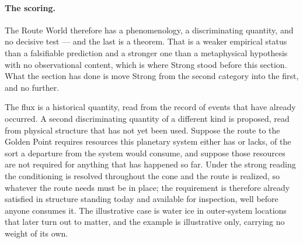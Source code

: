 \paragraph{The scoring.} The Route World therefore has a phenomenology, a
discriminating quantity, and no decisive test --- and the last is a
theorem. That is a weaker empirical status than a falsifiable prediction
and a stronger one than a metaphysical hypothesis with no observational
content, which is where Strong stood before this section. What the
section has done is move Strong from the second category into the first,
and no further.

\begin{remark}
\label{rw:rem:preposition}
The flux is a historical quantity, read from the record of events
that have already occurred. A second
discriminating quantity of a different kind is proposed, read from physical
structure that has not yet been used. Suppose the route to the
Golden Point requires resources this planetary system either has or
lacks, of the sort a departure from the system would consume, and
suppose those resources are not required for anything that has
happened so far. Under the strong reading the conditioning is
resolved throughout the cone and the route is realized, so whatever
the route needs must be in place; the requirement is therefore
already satisfied in structure standing today and available for
inspection, well before anyone consumes it. The
illustrative case is water ice in outer-system locations that later
turn out to matter, and the example is illustrative only, carrying
no weight of its own.


\end{remark}

